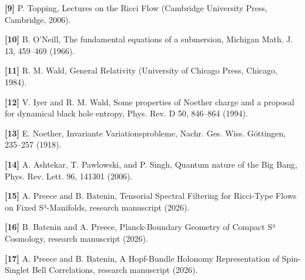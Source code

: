 \documentclass[
]{article}
\begin{document}
\textbf{{[}9{]}} P. Topping, Lectures on the Ricci Flow (Cambridge University Press, Cambridge, 2006).

\textbf{{[}10{]}} B. O'Neill, The fundamental equations of a submersion, Michigan Math. J. 13, 459--469 (1966).

\textbf{{[}11{]}} R. M. Wald, General Relativity (University of Chicago Press, Chicago, 1984).

\textbf{{[}12{]}} V. Iyer and R. M. Wald, Some properties of Noether charge and a proposal for dynamical black hole entropy, Phys. Rev. D 50, 846--864 (1994).

\textbf{{[}13{]}} E. Noether, Invariante Variationsprobleme, Nachr. Ges. Wiss. Göttingen, 235--257 (1918).

\textbf{{[}14{]}} A. Ashtekar, T. Pawlowski, and P. Singh, Quantum nature of the Big Bang, Phys. Rev. Lett. 96, 141301 (2006).

\textbf{{[}15{]}} A. Preece and B. Batenin, Tensorial Spectral Filtering for Ricci-Type Flows on Fixed S³-Manifolds, research manuscript (2026).

\textbf{{[}16{]}} B. Batenin and A. Preece, Planck-Boundary Geometry of Compact S³ Cosmology, research manuscript (2026).

\textbf{{[}17{]}} A. Preece and B. Batenin, A Hopf-Bundle Holonomy Representation of Spin-Singlet Bell Correlations, research manuscript (2026).
\end{document}

